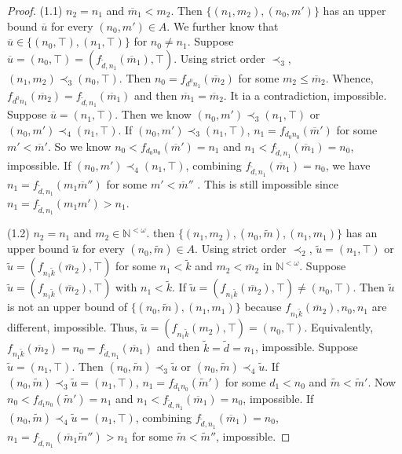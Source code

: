 \documentclass[preprint,12pt]{elsarticle}
\numberwithin{equation}{section}
\begin{document}
\begin{proof}
(1.1) $n_{2}=n_{1}$ and $\overline{m}_{1}<m_{2}$. Then $\{(n_{1},m_{2}),(n_{0},m')\}$ has an upper bound $\overline{u}$ for every $(n_{0},m')\in A$. We further know that $\overline{u}\in\{(n_{0},\top),(n_{1},\top)\}$ for $n_{0}\neq n_{1}$. Suppose $\overline{u}=(n_{0},\top)=(f_{\widetilde{d},n_{1}}(\overline{m}_{1}),\top)$. Using strict order $\prec_{3}$, $(n_{1},m_{2})\prec_{3} (n_{0},\top)$. Then $n_{0}=f_{d^{0}n_{1}}(\overline{m}_{2})$ for some $m_{2}\leq \overline{m}_{2}$. Whence, $f_{d^{0}n_{1}}(\overline{m}_{2})=f_{\widetilde{d},n_{1}}(\overline{m}_{1})$ and then $\overline{m}_{1}=\overline{m}_{2}$. It ia a contradiction, impossible. Suppose $\overline{u}=(n_{1},\top)$. Then we know $(n_{0},m')\prec_{3}(n_{1},\top)$ or $(n_{0},m')\prec_{4}(n_{1},\top)$. If $(n_{0},m')\prec_{3}(n_{1},\top)$, $n_{1}=f_{d_{0}n_{0}}(\overline{m}')$ for some $m'<\overline{m}'$. So we know $n_{0}<f_{d_{0}n_{0}}(\overline{m}')=n_{1}$ and $n_{1}<f_{\widetilde{d},n_{1}}(\overline{m}_{1})=n_{0}$, impossible. If $(n_{0},m')\prec_{4}(n_{1},\top)$, combining $f_{\widetilde{d},n_{1}}(\overline{m}_{1})=n_{0}$, we have $n_{1}=f_{\widetilde{d},n_{1}}(m_{1}\overline{m}'')$ for some $m'<\overline{m}''$ . This is still impossible since $n_{1}=f_{\widetilde{d},n_{1}}(m_{1}m')>n_{1}$.

(1.2) $n_{2}=n_{1}$ and $m_{2}\in\mathbb{N}^{<\omega}$. then $\{(n_{1},m_{2}),(n_{0},\tilde{m}),(n_{1},m_{1})\}$ has an upper bound $\widetilde{u}$ for every $(n_{0},\tilde{m})\in A$. Using strict order $\prec_{2}$, $\widetilde{u}=(n_{1},\top)$ or $\widetilde{u}=(f_{n_{1}\widetilde{k}}(\overline{m}_{2}),\top)$ for some $n_{1}<\widetilde{k}$ and $m_{2}< \overline{m}_{2}$ in $\mathbb{N}^{<\omega}$. Suppose $\widetilde{u}=(f_{n_{1}\widetilde{k}}(\overline{m}_{2}),\top)$ with $n_{1}<\widetilde{k}$. If $\widetilde{u}=(f_{n_{1}\widetilde{k}}(\overline{m}_{2}),\top)\neq(n_{0},\top)$. Then $\widetilde{u}$ is not an upper bound of $\{(n_{0},\tilde{m}),(n_{1},m_{1})\}$ because $f_{n_{1}\widetilde{k}}(\overline{m}_{2}),n_{0},n_{1}$ are different, impossible. Thus, $\widetilde{u}=(f_{n_{1}\widetilde{k}}(m_{2}),\top)=(n_{0},\top)$. Equivalently, $f_{n_{1}\widetilde{k}}(\overline{m}_{2})=n_{0}=f_{\widetilde{d},n_{1}}(\overline{m}_{1})$ and then $\widetilde{k}=\widetilde{d}=n_{1}$, impossible. Suppose $\widetilde{u}=(n_{1},\top)$. Then $(n_{0},\tilde{m})\prec_{3}\widetilde{u}$ or $(n_{0},\tilde{m})\prec_{4}\widetilde{u}$. If $(n_{0},\tilde{m})\prec_{3}\widetilde{u}=(n_{1},\top)$, $n_{1}=f_{d_{1}n_{0}}(\tilde{m}')$ for some $d_{1}<n_{0}$ and $\tilde{m}<\tilde{m}'$.
Now $n_{0}<f_{d_{1}n_{0}}(\tilde{m}')=n_{1}$ and $n_{1}<f_{\widetilde{d},n_{1}}(\overline{m}_{1})=n_{0}$, impossible. If $(n_{0},\tilde{m})\prec_{4}\widetilde{u}=(n_{1},\top)$, combining $f_{\widetilde{d},n_{1}}(\overline{m}_{1})=n_{0}$, $n_{1}=f_{\widetilde{d},n_{1}}(\overline{m}_{1}\tilde{m}'')>n_{1}$ for some $\tilde{m}<\tilde{m}''$, impossible.


\end{proof}
\end{document}
